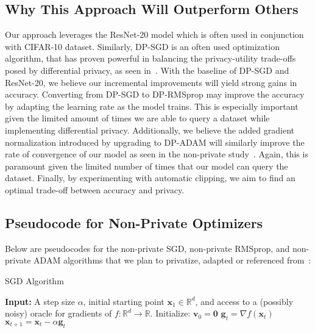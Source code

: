 \subsection{Why This Approach Will Outperform Others}\label{subsec:why-this-approach-will-outperform-others}
Our approach leverages the ResNet-20 model which is often used in conjunction with
CIFAR-10 dataset.
Similarly, DP-SGD is an often used optimization algorithm, that has proven powerful in balancing the privacy-utility trade-offs posed
by differential privacy, as seen in~\cite{Abadi_2016_DeepLearningDifferentialPrivacy}.
With the baseline
of DP-SGD and ResNet-20, we believe our incremental improvements will yield strong gains in
accuracy.
Converting from DP-SGD to DP-RMSprop may improve the accuracy by adapting the learning rate as the
model trains.
This is especially important given the limited amount of times we are able to
query a dataset while implementing differential privacy.
Additionally, we believe the added gradient normalization introduced by upgrading to DP-ADAM will
similarly improve the rate of convergence of our model as seen in the non-private study~\cite{DBLP:journals/corr/abs-1807-06766}.
Again, this is paramount given the
limited number of times that our model can query the dataset.
Finally, by experimenting with automatic clipping, we aim to
find an optimal trade-off between accuracy and privacy.

\subsection{Pseudocode for Non-Private Optimizers}\label{subsec:pseudo-code-for-non-private-optimizers}
Below are pseudocodes for the non-private SGD, non-private RMSprop, and non-private ADAM algorithms that we plan to privatize, adapted or referenced from~\cite{DBLP:journals/corr/abs-1807-06766}:
\begin{algorithm}
    \caption{SGD Algorithm}
    \label{alg:sgd}
    \begin{algorithmic}[1]
        \State \textbf{Input:} A step size $\alpha$, initial starting point $\mathbf{x}_1 \in \mathbb{R}^d$,
        and access to a (possibly noisy) oracle for gradients of $f : \mathbb{R}^d \rightarrow \mathbb{R}$.
            \State Initialize: $\mathbf{v}_0 = \mathbf{0}$
                \State $\mathbf{g}_t = \nabla f(\mathbf{x}_t)$
                \State $\mathbf{x}_{t+1} = \mathbf{x}_t - \alpha \mathbf{g}_t$
            \EndFor
        \EndFunction
    \end{algorithmic}
\end{algorithm}
\vspace{-1cm}

